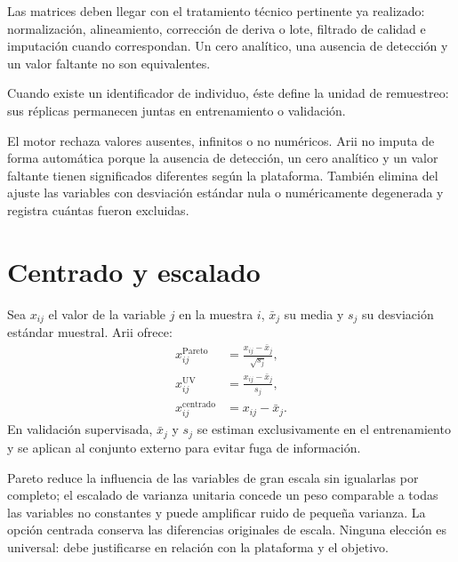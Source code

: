 \documentclass[11pt,a4paper,openany]{report}
\begin{document}
Las matrices deben llegar con el tratamiento técnico pertinente ya realizado: normalización, alineamiento, corrección de deriva o lote, filtrado de calidad e imputación cuando correspondan. Un cero analítico, una ausencia de detección y un valor faltante no son equivalentes.

Cuando existe un identificador de individuo, éste define la unidad de remuestreo: sus réplicas permanecen juntas en entrenamiento o validación.

El motor rechaza valores ausentes, infinitos o no numéricos. Arii no imputa de forma automática porque la ausencia de detección, un cero analítico y un valor faltante tienen significados diferentes según la plataforma. También elimina del ajuste las variables con desviación estándar nula o numéricamente degenerada y registra cuántas fueron excluidas.

\section{Centrado y escalado}
Sea $x_{ij}$ el valor de la variable $j$ en la muestra $i$, $\bar{x}_{j}$ su media y $s_j$ su desviación estándar muestral. Arii ofrece:
\begin{align}
  x^{\mathrm{Pareto}}_{ij} &= \frac{x_{ij}-\bar{x}_{j}}{\sqrt{s_j}}, \\
  x^{\mathrm{UV}}_{ij} &= \frac{x_{ij}-\bar{x}_{j}}{s_j}, \\
  x^{\mathrm{centrado}}_{ij} &= x_{ij}-\bar{x}_{j}.
\end{align}
En validación supervisada, $\bar{x}_{j}$ y $s_j$ se estiman exclusivamente en el entrenamiento y se aplican al conjunto externo para evitar fuga de información.

Pareto reduce la influencia de las variables de gran escala sin igualarlas por completo; el escalado de varianza unitaria concede un peso comparable a todas las variables no constantes y puede amplificar ruido de pequeña varianza. La opción centrada conserva las diferencias originales de escala. Ninguna elección es universal: debe justificarse en relación con la plataforma y el objetivo.
\end{document}
